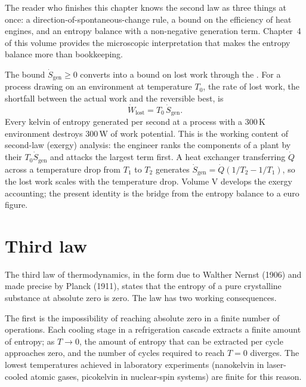 The reader who finishes this chapter knows the second law as three
things at once: a direction-of-spontaneous-change rule, a bound on the
efficiency of heat engines, and an entropy balance with a
non-negative generation term. Chapter~4 of this volume provides the
microscopic interpretation that makes the entropy balance more than
bookkeeping.

\begin{mastery}
The bound $\dot{S}_{\text{gen}} \geq 0$ converts into a bound on lost
work through the . For a process drawing
on an environment at temperature $T_0$, the rate of lost work, the
shortfall between the actual work and the reversible best, is
\[
\dot{W}_{\text{lost}} = T_0 \, \dot{S}_{\text{gen}}.
\]
Every kelvin of entropy generated per second at a process with a
$300\,\si{\kelvin}$ environment destroys $300\,\text{W}$ of work
potential. This is the working content of second-law (exergy)
analysis: the engineer ranks the components of a plant by their
$T_0 \dot{S}_{\text{gen}}$ and attacks the largest term first. A heat
exchanger transferring $\dot{Q}$ across a temperature drop from $T_1$
to $T_2$ generates $\dot{S}_{\text{gen}} = \dot{Q}(1/T_2 - 1/T_1)$, so
the lost work scales with the temperature drop. Volume V develops the
exergy accounting; the present identity is the bridge from the entropy
balance to a euro figure.
\end{mastery}

\section{Third law}

The third law of thermodynamics, in the form due to Walther Nernst
(1906) and made precise by Planck (1911), states that the entropy of a
pure crystalline substance at absolute zero is zero. The law has two
working consequences.

The first is the impossibility of reaching absolute zero in a finite
number of operations. Each cooling stage in a refrigeration cascade
extracts a finite amount of entropy; as $T \to 0$, the amount of
entropy that can be extracted per cycle approaches zero, and the
number of cycles required to reach $T = 0$ diverges. The lowest
temperatures achieved in laboratory experiments (nanokelvin in
laser-cooled atomic gases, picokelvin in nuclear-spin systems) are
finite for this reason.


